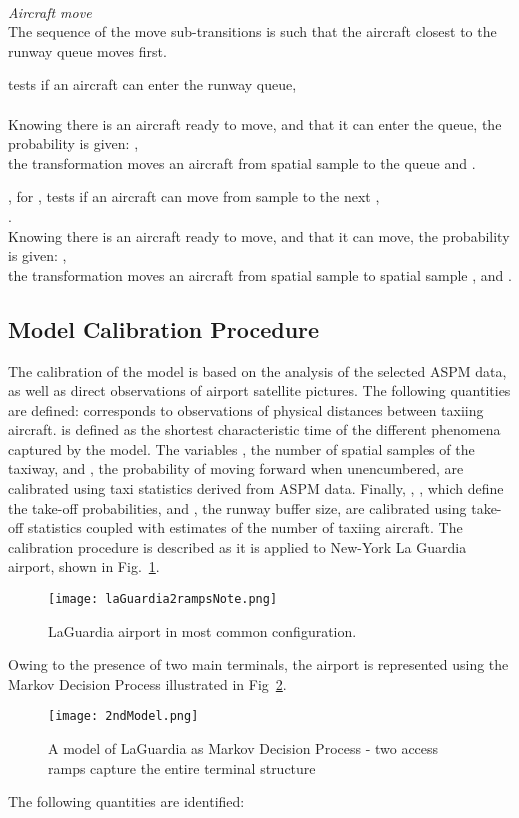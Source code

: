 \documentclass[letterpaper]{article}
\begin{document}
\emph{\\Aircraft move}\\
The sequence of the move sub-transitions is such that the aircraft closest to the runway queue moves first.

\begin{description}
\item  tests if an aircraft can enter the runway queue,\\
\\
Knowing there is an aircraft ready to move, and that it can enter the queue, the probability is given: ,\\
the transformation  moves an aircraft from spatial sample  to the queue  and .

\item ,  for , tests if an aircraft can move from sample  to the next ,\\
.\\
Knowing there is an aircraft ready to move, and that it can move, the probability is given: ,\\
the transformation  moves an aircraft from spatial sample  to spatial sample ,  and .
\end{description}

\fi


\subsection{Model Calibration Procedure} \label{s:calibration}
The calibration of the model is based on the analysis of the selected ASPM data, as well as 
direct observations of airport satellite pictures. The following quantities are defined:  corresponds to observations 
of physical distances between taxiing aircraft.  is defined as the shortest characteristic time of the different phenomena
 captured by the model. The variables , the number of spatial samples of the taxiway, and , the probability of moving forward 
 when unencumbered, are calibrated using taxi statistics derived from ASPM data. 
 Finally, , , which define the take-off probabilities, and , the runway buffer size, are calibrated using take-off 
 statistics coupled with estimates of the number of taxiing aircraft. The calibration procedure is described as it is applied to New-York La Guardia airport, shown in Fig.~\ref{f:LGQuickAccess}.
\begin{figure}[ht]
\centering
\texttt{[image: laGuardia2rampsNote.png]}
\caption{LaGuardia airport in most common configuration.}
\label{f:LGQuickAccess}
\end{figure} 
Owing to the presence of two main terminals, the airport is represented using the Markov Decision Process illustrated in Fig~\ref{f:2ndModel}.
\begin{figure}[ht]
\centering
\texttt{[image: 2ndModel.png]}
\caption{A model of LaGuardia as Markov Decision Process - two access ramps capture the entire terminal structure}
\label{f:2ndModel}
\end{figure}
The following quantities are identified:
\end{document}
